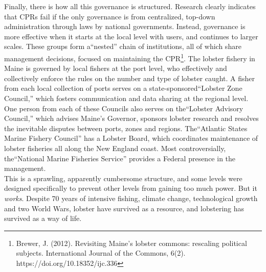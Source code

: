 Finally, there is how all this governance is structured. Research clearly indicates that CPRs fail if the only governance is from centralized, top-down administration through laws by national governments. Instead, governance is more effective when  it starts at the local level with users, and continues to larger scales. These groups form a``nested'' chain of institutions, all of which share management decisions, focused on maintaining the CPR\footnote{Brewer, J. (2012). Revisiting Maine's lobster commons: rescaling political subjects. International Journal of the Commons, 6(2). https://doi.org/10.18352/ijc.336}. The lobster fishery in Maine is governed by local fishers at the port level, who effectively and collectively enforce the rules on the number and type of lobster caught. A fisher from each local collection of ports serves on a state-sponsored``Lobster Zone Council,'' which fosters communication and data sharing at the regional level. One person from each of these Councils also serves on the``Lobster Advisory Council,'' which advises Maine's Governor, sponsors lobster research and resolves the inevitable disputes between ports, zones and regions. The``Atlantic States Marine Fishery Council'' has a Lobster Board, which coordinates maintenance of lobster fisheries all along the New England coast. Most controversially, the``National Marine Fisheries Service'' provides a Federal presence in the management.\\

This is a sprawling, apparently cumbersome structure, and some levels were designed specifically to prevent other levels from gaining too much power. But it \emph{works}. Despite 70 years of intensive fishing, climate change, technological growth and two World Wars, lobster have survived as a resource, and lobstering has survived as a way of life.  \\  

